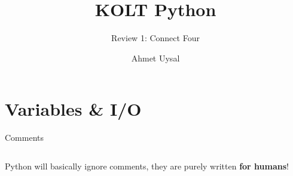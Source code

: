 
\usepackage{../KU-Beamer-Template/style/koc} 
\usepackage{minted}
\usepackage{upquote}

\title{KOLT Python} 
\subtitle{Review 1: Connect Four} 
\date{}
\author{Ahmet Uysal}




    \maketitle

    \section{Variables \& I/O}

        \begin{frame}{Comments}
            \LARGE
            \inputminted[frame=single,framesep=2pt]{python3}{../Lecture1/code-examples/comments.py}
            Python will basically ignore comments, they are purely written \textbf{for humans}!
        \end{frame}

